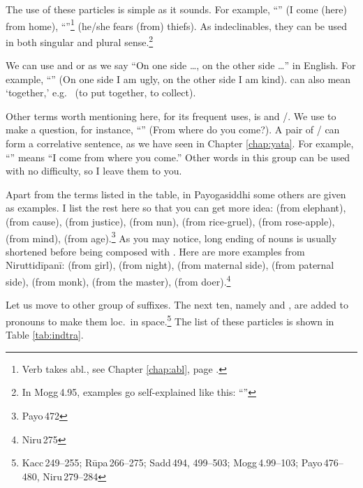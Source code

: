 The use of these particles is simple as it sounds. For example, ``'' (I come (here) from home), ``''\footnote{Verb  takes abl., see Chapter \ref{chap:abl}, page \pageref{sec:ablverbs}.} (he/she fears (from) thiefs). As indeclinables, they can be used in both singular and plural sense.\footnote{In Mogg\,4.95, examples go self-explained like this: ``''}

We can use  and  or  as we say ``On one side \ldots, on the other side \ldots'' in English. For example, ``'' (On one side I am ugly, on the other side I am kind).  can also mean `together,' e.g.\  (to put together, to collect).

Other terms worth mentioning here, for its frequent uses, is  and /. We use  to make a question, for instance, ``'' (From where do you come?). A pair of / can form a correlative sentence, as we have seen in Chapter \ref{chap:yata}. For example, ``'' means ``I come from where you come.'' Other words in this group can be used with no difficulty, so I leave them to you.

Apart from the terms listed in the table, in Payogasiddhi some others are given as examples. I list the rest here so that you can get more idea:  (from elephant),  (from cause),  (from justice),  (from nun),  (from rice-gruel),  (from rose-apple),  (from mind),  (from age).\footnote{Payo\,472} As you may notice, long ending of nouns is usually shortened before being composed with . Here are more examples from Niruttid\=ipan\=i:  (from girl),  (from night),  (from maternal side),  (from paternal side),  (from monk),  (from the master),  (from doer).\footnote{Niru\,275}

Let us move to other group of suffixes. The next ten, namely  and , are added to pronouns to make them loc.\ in space.\footnote{Kacc\,249--255; R\=upa\,266--275; Sadd\,494, 499--503; Mogg\,4.99--103; Payo\,476--480, Niru\,279--284} The list of these particles is shown in Table \ref{tab:indtra}.

